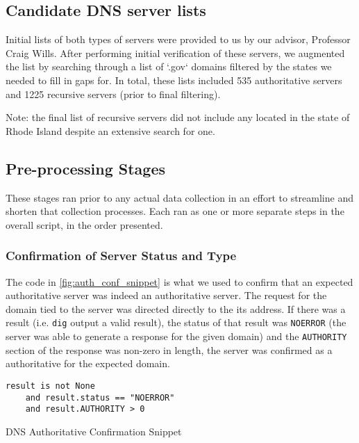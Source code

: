 \subsection{Candidate DNS server lists}

Initial lists of both types of \dns servers were provided to us by our advisor, Professor Craig Wills. After performing initial verification of these servers, we augmented the list by searching through a list of `.gov` domains filtered by the states we needed to fill in gaps for. In total, these lists included 535 authoritative servers and 1225 recursive servers (prior to final filtering).

Note: the final list of recursive servers did not include any located in the state of Rhode Island despite an extensive search for one.

\subsection{Pre-processing Stages}

These stages ran prior to any actual data collection in an effort to streamline and shorten that collection processes. Each ran as one or more separate steps in the overall script, in the order presented.

\subsubsection{Confirmation of Server Status and Type}\label{sec:dns_impl_confirmation_of_status_and_type}

The code in \cref{fig:auth_conf_snippet} is what we used to confirm that an expected authoritative server was indeed an authoritative server. The request for the domain tied to the server was directed directly to the its \ip address. If there was a result (i.e. \texttt{dig} output a valid result), the status of that result was \texttt{NOERROR} (the server was able to generate a response for the given domain) and the \texttt{AUTHORITY} section of the response was non-zero in length, the server was confirmed as a authoritative for the expected domain.
\begin{code}[H]
\centering
    \begin{verbatim}
result is not None 
    and result.status == "NOERROR" 
    and result.AUTHORITY > 0
    \end{verbatim}
    \caption{DNS Authoritative Confirmation Snippet}
    \label{fig:auth_conf_snippet}
\end{code}


